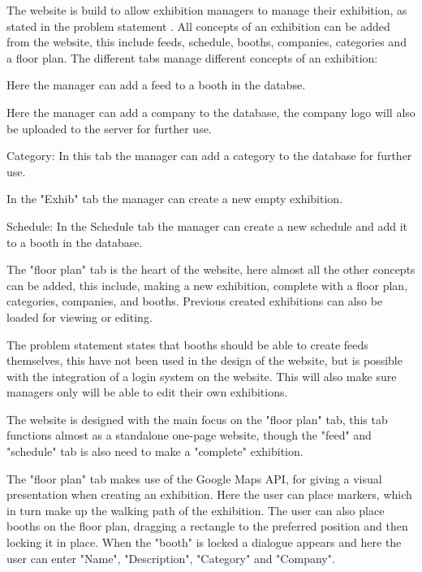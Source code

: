 The website is build to allow exhibition managers to manage their exhibition, as stated in the problem statement . All concepts of an exhibition can be added from the website, this include feeds, schedule, booths, companies, categories and a floor plan.
The different tabs manage different concepts of an exhibition:


\begin{description}
	\item[Feeds] Here the manager can add a feed to a booth in the databse.
	\item[Company] Here the manager can add a company to the database, the company logo will also be uploaded to the server for further use.
	\item Category: In this tab the manager can add a category to the database for further use.
	\item[Exhib] In the "Exhib" tab the manager can create a new empty exhibition.
	\item Schedule: In the Schedule tab the manager can create a new schedule and add it to a booth in the database.
	\item[Floor plan] The "floor plan" tab is the heart of the website, here almost all the other concepts can be added, this include, making a new exhibition, complete with a floor plan, categories, companies, and booths. Previous created exhibitions can also be loaded for viewing or editing.
\end{description}


The problem statement  states that booths should be able to create feeds themselves, this have not been used in the design of the website, but is possible with the integration of a login system on the website. This will also make sure managers only will be able to edit their own exhibitions.


The website is designed with the main focus on the "floor plan" tab, this tab functions almost as a standalone one-page website, though the "feed" and "schedule" tab is also need to make a "complete" exhibition.


The "floor plan" tab makes use of the Google Maps API, for giving a visual presentation when creating an exhibition.
Here the user can place markers, which in turn make up the walking path of the exhibition. The user can also place booths on the floor plan, dragging a rectangle to the preferred position and then locking it in place. When the "booth" is locked a dialogue appears and here the user can enter "Name", "Description", "Category" and "Company".


